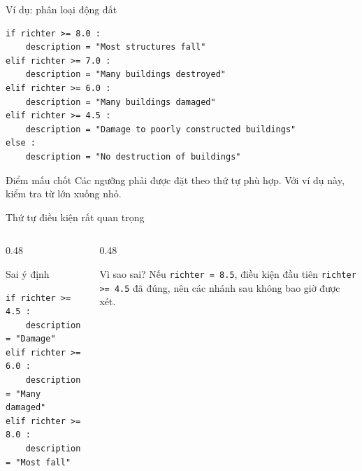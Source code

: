 \documentclass[aspectratio=169,11pt]{beamer}
\newcommand{\code}[1]{\texttt{#1}}
\begin{document}
\begin{frame}[fragile]{Ví dụ: phân loại động đất}
\begin{lstlisting}[style=py]
if richter >= 8.0 :
    description = "Most structures fall"
elif richter >= 7.0 :
    description = "Many buildings destroyed"
elif richter >= 6.0 :
    description = "Many buildings damaged"
elif richter >= 4.5 :
    description = "Damage to poorly constructed buildings"
else :
    description = "No destruction of buildings"
\end{lstlisting}
\begin{block}{Điểm mấu chốt}
Các ngưỡng phải được đặt theo thứ tự phù hợp. Với ví dụ này, kiểm tra từ lớn xuống nhỏ.
\end{block}
\end{frame}

\begin{frame}[fragile]{Thứ tự điều kiện rất quan trọng}
\begin{columns}[T]
\begin{column}{0.48\textwidth}
\begin{alertblock}{Sai ý định}
\begin{lstlisting}[style=py]
if richter >= 4.5 :
    description = "Damage"
elif richter >= 6.0 :
    description = "Many damaged"
elif richter >= 8.0 :
    description = "Most fall"
\end{lstlisting}
\end{alertblock}
\end{column}
\begin{column}{0.48\textwidth}
\begin{exampleblock}{Vì sao sai?}
Nếu \code{richter = 8.5}, điều kiện đầu tiên \code{richter >= 4.5} đã đúng, nên các nhánh sau không bao giờ được xét.
\end{exampleblock}
\end{column}
\end{columns}
\end{frame}
\end{document}
